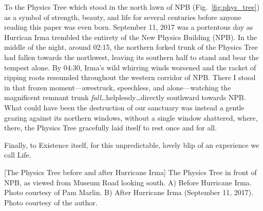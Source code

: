 To the Physics Tree which stood in the north lawn of NPB (Fig.~\ref{fig:phys_tree}) as a symbol of strength, beauty, and life for several centuries before anyone reading this paper was even born.
September 11, 2017 was a portentous day as Hurrican Irma trembled the entirety of the New Physics Building (NPB).
In the middle of the night, around 02:15, the northern forked trunk of the Physics Tree had fallen towards the northwest, leaving its southern half to stand and bear the tempest alone.
By 04:30, Irma's wild whirring winds worsened and the racket of ripping roots resounded throughout the western corridor of NPB.
There I stood in that frozen moment---awestruck, speechless, and alone---watching the magnificent remnant trunk \emph{fall}\ldots helplessly\ldots directly southward towards NPB.
What could have been the destruction of our sanctuary was instead a gentle grazing against its northern windows, without a single window shattered, where, there, the Physics Tree gracefully laid itself to rest once and for all.

Finally, to Existence itself, for this unpredictable, lovely blip of an experience we call Life.
\begin{multiFigure}
    \centering
        [The Physics Tree before and after Hurricane Irma]
        {The Physics Tree in front of NPB, as viewed from Museum Road looking south.
        \;A) Before Hurricane Irma. Photo courtesy of Pam Marlin.
        \;B) After Hurricane Irma (September 11, 2017). Photo courtesy of the author.
        }
    \label{fig:phys_tree}
\end{multiFigure}
